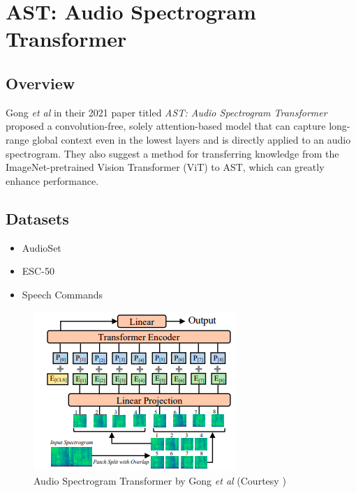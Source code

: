 \section{AST: Audio Spectrogram Transformer} \label{appendix:ast-paper}

\subsection{Overview}

\par Gong \textit{et al} in their 2021 paper titled \textit{AST: Audio Spectrogram Transformer} \cite{ast} proposed a convolution-free, solely attention-based model that can capture long-range global context even in the lowest layers and is directly applied to an audio spectrogram. They also suggest a method for transferring knowledge from the ImageNet-pretrained Vision Transformer (ViT) to AST, which can greatly enhance performance.\par

\subsection{Datasets}
\begin{itemize}
\item AudioSet
\item ESC-50 
\item Speech Commands
\end{itemize}

\begin{figure}[h]
	\includegraphics[width=\linewidth]{assets/img/ast_methodology.png}
	\caption{Audio Spectrogram Transformer by Gong
	\textit{et al} (Courtesy \cite{ast})}
\end{figure}

